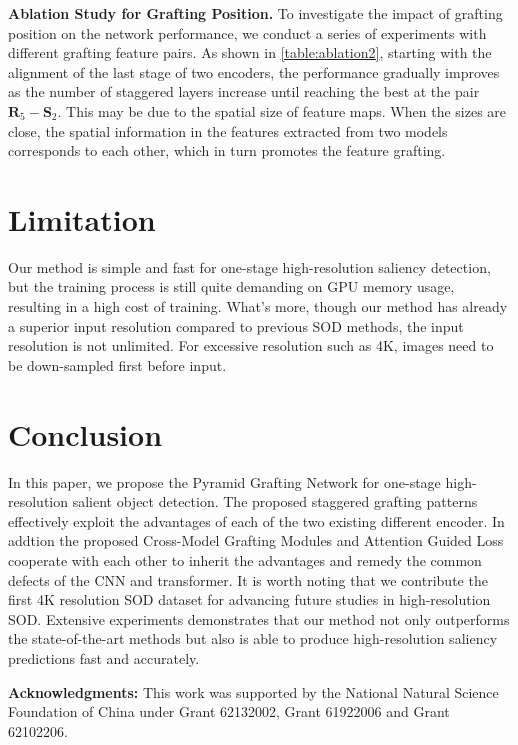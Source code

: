 \documentclass[10pt,twocolumn,letterpaper]{article}
\begin{document}
\textbf{Ablation Study for Grafting Position.}
To investigate the impact of grafting position on the network performance, we conduct a series of experiments with different grafting feature pairs. As shown in \cref{table:ablation2}, starting with the alignment of the last stage of two encoders, the performance gradually improves as the number of staggered layers increase until reaching the best at the pair $\bm{R}_5-\bm{S}_2$. This may be due to the spatial size of feature maps. When the sizes are close, the spatial information in the features extracted from two models corresponds to each other, which in turn promotes the feature grafting.


\section{Limitation}
Our method is simple and fast for one-stage high-resolution saliency detection, but the training process is still quite demanding on GPU memory usage, resulting in a high cost of training. What's more, though our method has already a superior input resolution compared to previous SOD methods, the input resolution is not unlimited. For excessive resolution such as 4K, images need to be down-sampled first before input.


\section{Conclusion}
In this paper, we propose the Pyramid Grafting Network for one-stage high-resolution salient object detection. The proposed staggered grafting patterns effectively exploit the advantages of each of the two existing different encoder. In addtion the proposed Cross-Model Grafting Modules and Attention Guided Loss cooperate with each other to inherit the advantages and remedy the common defects of the CNN and transformer. It is worth noting that we contribute the first 4K resolution SOD dataset for advancing future studies in high-resolution SOD. Extensive experiments demonstrates that our method not only outperforms the state-of-the-art methods but also is able to produce high-resolution saliency predictions fast and accurately.


\noindent\textbf{Acknowledgments:} This work was supported by the National Natural Science Foundation of China under Grant 62132002, Grant 61922006 and Grant 62102206.





{\small


}
\end{document}
